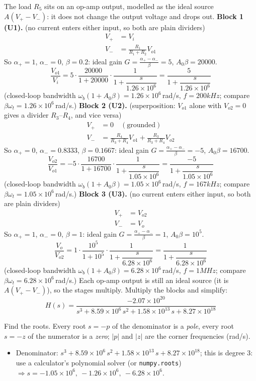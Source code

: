 \documentclass[11pt]{article}
\newcommand{\solstep}[2]{\par\medskip{\color{stepc}\textbf{Step #1 --- #2}}\par\nopagebreak}
\begin{document}
The load $R_{5}$ sits on an op-amp output, modelled as the ideal source $A(V_+-V_-)$: it does not change the output voltage and drops out.
\textbf{Block 1 (U1).} (no current enters either input, so both are plain dividers)\begin{align*}
V_+ &= V_{i} \\
V_- &= \frac{R_{1}}{R_{1}+R_{2}}V_{o1}
\end{align*}
So $\alpha_+ = 1$, $\alpha_- = 0$, $\beta = 0.2$: ideal gain $G = \frac{\alpha_+-\alpha_-}{\beta} = 5$, $A_0\beta = 20000$.\[
\frac{V_{o1}}{V_{i}} = 5\cdot\frac{20000}{1+20000}\cdot\frac{1}{1+\dfrac{s}{1.26\times 10^{6}}} = \frac{5}{1+\dfrac{s}{1.26\times 10^{6}}}
\]
(closed-loop bandwidth $\omega_b(1+A_0\beta) = 1.26\times 10^{6}$\,rad/s, $f = 200 kHz$; compare $\beta\omega_t = 1.26\times 10^{6}$\,rad/s.)
\textbf{Block 2 (U2).} (superposition: $V_{o1}$ alone with $V_{o2}=0$ gives a divider $R_{3}$--$R_{4}$, and vice versa)\begin{align*}
V_+ &= 0 \quad(\text{grounded}) \\
V_- &= \frac{R_{4}}{R_{3}+R_{4}}V_{o1} + \frac{R_{3}}{R_{3}+R_{4}}V_{o2}
\end{align*}
So $\alpha_+ = 0$, $\alpha_- = 0.8333$, $\beta = 0.1667$: ideal gain $G = \frac{\alpha_+-\alpha_-}{\beta} = -5$, $A_0\beta = 16700$.\[
\frac{V_{o2}}{V_{o1}} = -5\cdot\frac{16700}{1+16700}\cdot\frac{1}{1+\dfrac{s}{1.05\times 10^{6}}} = \frac{-5}{1+\dfrac{s}{1.05\times 10^{6}}}
\]
(closed-loop bandwidth $\omega_b(1+A_0\beta) = 1.05\times 10^{6}$\,rad/s, $f = 167 kHz$; compare $\beta\omega_t = 1.05\times 10^{6}$\,rad/s.)
\textbf{Block 3 (U3).} (no current enters either input, so both are plain dividers)\begin{align*}
V_+ &= V_{o2} \\
V_- &= V_{o}
\end{align*}
So $\alpha_+ = 1$, $\alpha_- = 0$, $\beta = 1$: ideal gain $G = \frac{\alpha_+-\alpha_-}{\beta} = 1$, $A_0\beta = 10^{5}$.\[
\frac{V_{o}}{V_{o2}} = 1\cdot\frac{10^{5}}{1+10^{5}}\cdot\frac{1}{1+\dfrac{s}{6.28\times 10^{6}}} = \frac{1}{1+\dfrac{s}{6.28\times 10^{6}}}
\]
(closed-loop bandwidth $\omega_b(1+A_0\beta) = 6.28\times 10^{6}$\,rad/s, $f = 1 MHz$; compare $\beta\omega_t = 6.28\times 10^{6}$\,rad/s.)
Each op-amp output is still an ideal source (it is $A(V_+-V_-)$), so the stages multiply.
Multiply the blocks and simplify:\[
H(s) = \dfrac{-2.07\times 10^{20}}{s^{3} + 8.59\times 10^{6}\,s^{2} + 1.58\times 10^{13}\,s + 8.27\times 10^{18}}
\]

\solstep{5}{Standard (Bode-ready) form}Find the roots. Every root $s=-p$ of the denominator is a \emph{pole}, every root $s=-z$ of the numerator is a \emph{zero}; $|p|$ and $|z|$ are the corner frequencies (rad/s).
\begin{itemize}[leftmargin=*,itemsep=2pt]
\item Denominator: $s^{3} + 8.59\times 10^{6}\,s^{2} + 1.58\times 10^{13}\,s + 8.27\times 10^{18}$; this is degree 3: use a calculator's polynomial solver (or \texttt{numpy.roots}) $\Rightarrow s = -1.05\times 10^{6},\ -1.26\times 10^{6},\ -6.28\times 10^{6}$.
\end{itemize}
\end{document}
